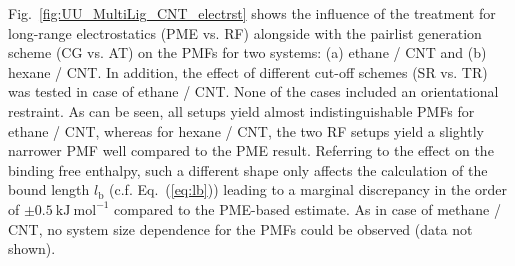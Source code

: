 \documentclass[9pt,lessons,pubversion]{livecoms}
\begin{document}
Fig.~\ref{fig:UU_MultiLig_CNT_electrst} shows the influence of the treatment for long-range electrostatics (PME vs. RF) alongside with the pairlist generation scheme (CG vs. AT) on the PMFs for two systems: 
(a) ethane / CNT and (b) hexane / CNT. 
In addition, the effect of different cut-off schemes (SR vs. TR) was tested in case of ethane / CNT.
None of the cases included an orientational restraint.
As can be seen, all setups yield almost indistinguishable PMFs for ethane / CNT, whereas for hexane / CNT, the two RF setups yield a slightly narrower PMF well compared to the PME result. 
Referring to the effect on the binding free enthalpy, such a different shape only affects the calculation of the bound length $l_\mathrm{b}$ (c.f. Eq.~(\ref{eq:lb})) leading to a marginal 
discrepancy in the order of $\pm 0.5~\mathrm{kJ}~\mathrm{mol}^{-1}$ compared to the PME-based estimate.
As in case of methane / CNT, no system size dependence for the PMFs could be observed (data not shown).
\end{document}
